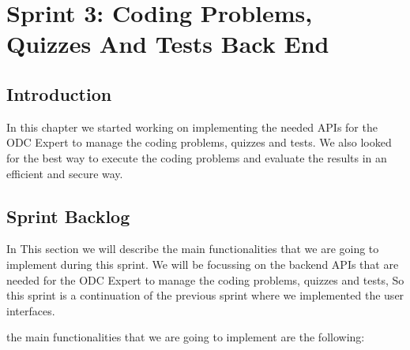 \chapter{Sprint 3: Coding Problems, Quizzes And Tests Back End}

\section{Introduction}
In this chapter we started working on implementing the needed APIs for the ODC Expert
to manage the coding problems, quizzes and tests. We also looked for
the best way to execute the coding problems and evaluate the results in an efficient and secure way.

\section{Sprint Backlog}
In This section we will describe the main functionalities that we are going to implement during this sprint.
We will be focussing on the backend APIs that are needed for the ODC Expert to manage the coding problems,
quizzes and tests, So this sprint is a continuation of the previous sprint where we implemented the user interfaces.

the main functionalities that we are going to implement are the following:


